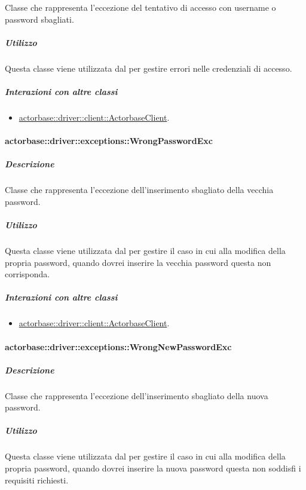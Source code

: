 \documentclass{scalatekids-article}
\begin{document}
Classe che rappresenta l'eccezione del tentativo di accesso con username o password sbagliati.

\subparagraph{Utilizzo}

Questa classe viene utilizzata dal  per gestire errori nelle credenziali di accesso.

\subparagraph{Interazioni con altre classi}

\begin{itemize}
\item \hyperref[sec:actorbase::driver::client::ActorbaseClient]{actorbase::driver::client::ActorbaseClient}.
\end{itemize}

\paragraph{actorbase::driver::exceptions::WrongPasswordExc}

\subparagraph{Descrizione}

Classe che rappresenta l'eccezione dell'inserimento sbagliato della vecchia password.

\subparagraph{Utilizzo}

Questa classe viene utilizzata dal  per gestire il caso in cui alla modifica della propria password, quando dovrei inserire la vecchia password questa non corrisponda.

\subparagraph{Interazioni con altre classi}

\begin{itemize}
\item \hyperref[sec:actorbase::driver::client::ActorbaseClient]{actorbase::driver::client::ActorbaseClient}.
\end{itemize}

\paragraph{actorbase::driver::exceptions::WrongNewPasswordExc}

\subparagraph{Descrizione}

Classe che rappresenta l'eccezione dell'inserimento sbagliato della nuova password.

\subparagraph{Utilizzo}

Questa classe viene utilizzata dal  per gestire il caso in cui alla modifica della propria password, quando dovrei inserire la nuova password questa non soddisfi i requisiti richiesti.
\end{document}
